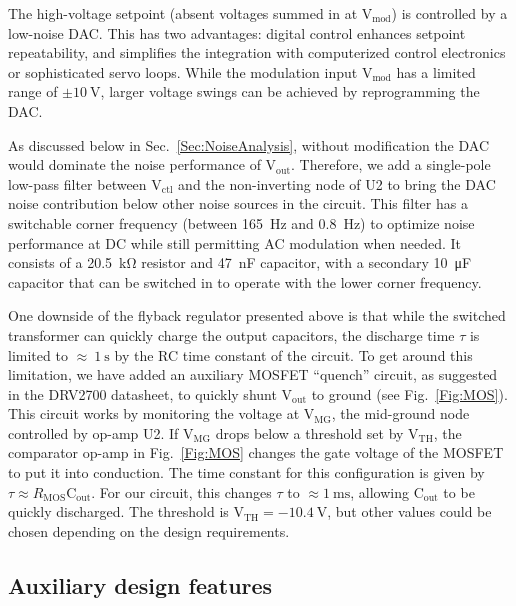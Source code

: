 \documentclass[aip,rsi,reprint]{revtex4-1} %
\begin{document}
The high-voltage setpoint (absent voltages summed in at $\text{V}_\text{mod}$) is controlled by a low-noise DAC.
This has two advantages: digital control enhances setpoint repeatability, and simplifies the integration with computerized control electronics or sophisticated servo loops.
While the modulation input $\text{V}_\text{mod}$ has a limited range of $\pm\SI{10}{\volt}$, larger voltage swings can be achieved by reprogramming the DAC.

As discussed below in Sec.~\ref{Sec:NoiseAnalysis}, without modification the DAC would dominate the noise performance of $\text{V}_\text{out}$.
Therefore, we add a single-pole low-pass filter between $\text{V}_\text{ctl}$ and the non-inverting node of U2 to bring the DAC noise contribution below other noise sources in the circuit.
This filter has a switchable corner frequency (between \SI{165}{\hertz} and \SI{0.8}{\hertz}) to optimize noise performance at DC while still permitting AC modulation when needed.
It consists of a \SI{20.5}{\kilo\ohm} resistor and \SI{47}{\nano\farad} capacitor, with a secondary \SI{10}{\micro\farad} capacitor that can be switched in to operate with the lower corner frequency.

One downside of the flyback regulator presented above is that while the switched transformer can quickly charge the output capacitors, the discharge time $\tau$ is limited to {$\approx~\SI{1}{\second}$} by the RC time constant of the circuit.
To get around this limitation, we have added an auxiliary MOSFET ``quench'' circuit, as suggested in the DRV2700 datasheet\cite{DRV2700Datasheet}, to quickly shunt $\text{V}_\text{out}$ to ground (see Fig.~\ref{Fig:MOS}).
This circuit works by monitoring the voltage at $\text{V}_\text{MG}$, the mid-ground node controlled by op-amp U2.
If $\text{V}_\text{MG}$ drops below a threshold set by $\text{V}_\text{TH}$, the comparator op-amp in Fig.~\ref{Fig:MOS} changes the gate voltage of the MOSFET to put it into conduction.
The time constant for this configuration is given by $\tau \approx R_\text{MOS}\text{C}_\text{out}$.
For our circuit, this changes $\tau$ to $\approx\SI{1}{\milli\second}$, allowing $\text{C}_\text{out}$ to be quickly discharged.
The threshold is $\text{V}_\text{TH} = \SI{-10.4}{\volt}$, but other values could be chosen depending on the design requirements.



\subsection{Auxiliary design features}
\label{Sec:AuxDesign}
\end{document}
